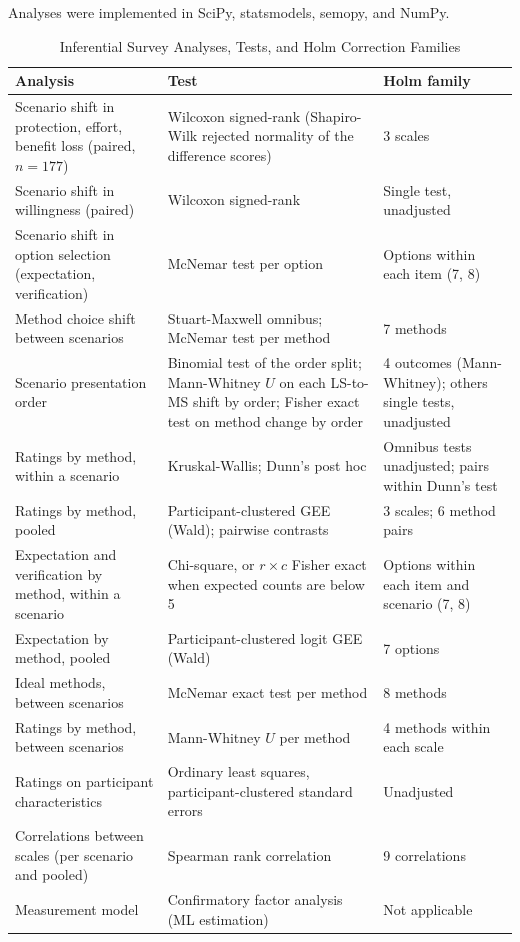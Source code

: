 \documentclass[conference,compsoc]{IEEEtran}
\begin{document}
Analyses were implemented in SciPy, statsmodels, semopy, and NumPy.

\begin{table}[t]
\centering
\caption{Inferential Survey Analyses, Tests, and Holm Correction Families}
\label{tab:analysis-families}
\small
\begin{tabular}{@{}p{}p{}p{}@{}}
\toprule
Analysis & Test & Holm family \\
\midrule
Scenario shift in protection, effort, benefit loss (paired, $n=177$)
  & Wilcoxon signed-rank (Shapiro-Wilk rejected normality of the difference scores)
  & 3 scales \\
Scenario shift in willingness (paired)
  & Wilcoxon signed-rank
  & Single test, unadjusted \\
Scenario shift in option selection (expectation, verification)
  & McNemar test per option
  & Options within each item (7, 8) \\
Method choice shift between scenarios
  & Stuart-Maxwell omnibus; McNemar test per method
  & 7 methods \\
Scenario presentation order
  & Binomial test of the order split; Mann-Whitney $U$ on each LS-to-MS shift by order; Fisher exact test on method change by order
  & 4 outcomes (Mann-Whitney); others single tests, unadjusted \\
Ratings by method, within a scenario
  & Kruskal-Wallis; Dunn's post hoc
  & Omnibus tests unadjusted; pairs within Dunn's test \\
Ratings by method, pooled
  & Participant-clustered GEE (Wald); pairwise contrasts
  & 3 scales; 6 method pairs \\
Expectation and verification by method, within a scenario
  & Chi-square, or $r\times c$ Fisher exact when expected counts are below 5
  & Options within each item and scenario (7, 8) \\
Expectation by method, pooled
  & Participant-clustered logit GEE (Wald)
  & 7 options \\
Ideal methods, between scenarios
  & McNemar exact test per method
  & 8 methods \\
Ratings by method, between scenarios
  & Mann-Whitney $U$ per method
  & 4 methods within each scale \\
Ratings on participant characteristics
  & Ordinary least squares, participant-clustered standard errors
  & Unadjusted \\
Correlations between scales (per scenario and pooled)
  & Spearman rank correlation
  & 9 correlations \\
Measurement model
  & Confirmatory factor analysis (ML estimation)
  & Not applicable \\
\bottomrule
\end{tabular}
\end{table}
\end{document}
